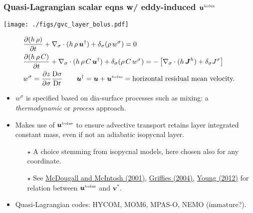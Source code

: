 \documentclass[10pt]{beamer}
\begin{document}
\begin{frame}
  \frametitle{Quasi-Lagrangian scalar eqns w/ eddy-induced ${\bm u}^{\mbox{\tiny bolus}}$}

\begin{center}
\vspace{-.3cm}
{\texttt{[image: ./figs/gvc\_layer\_bolus.pdf]}}
\end{center}
\vspace{-.5cm}

\begin{align}
  &\frac{\partial (h \, \rho)}{\partial  t} + \nabla_{\sigma} \cdot (h \, \rho \, {\bm u}^{\dagger} ) 
 + \delta_{\sigma} (\rho \, w^{\sigma} ) 
 = 0 
 \\
  &\frac{\partial (h \, \rho \, C)}{\partial  t} + \nabla_{\sigma} \cdot (h \, \rho \, C \, {\bm u}^{\dagger} ) 
 + \delta_{\sigma} (\rho \, C \, w^{\sigma} ) 
 =
 -\left[  \nabla_{\sigma} \cdot ( h \, {\bm J}^{h}) +  \delta_{\sigma} J^{\sigma} \right] 
 \\
  &w^{\sigma} =  \frac{\partial z}{\partial \sigma}  \frac{ \mathrm{D} \sigma}{\mathrm{D}t} 
 \qquad {\bm u}^{\dagger}  = {\bm u} + {\bm u}^{\mbox{\tiny bolus}}  = \mbox{horizontal residual mean velocity.}
\label{eq:gvc-mass-tracer-equation}
\end{align}


\vspace{-.2cm} 
\begin{exampleblock}{}
\begin{itemize}

\item $w^{\sigma}$ is specified based on dia-surface processes such as
  mixing: a {\it thermodynamic} or {\it process} approach.

\item Makes use of ${\bm u}^{\mbox{\tiny bolus}}$ to ensure advective
  transport retains layer integrated constant mass, even if not an
  adiabatic isopycnal layer.
 \begin{itemize}
 \item[$\star$] \scriptsize A choice stemming from isopycnal models,
   here chosen also for any coordinate.
 \item[$\star$] See
   \href{https://doi.org/10.1175/1520-0485(2001)031<1222:TTRMVP>2.0.CO;2}{McDougall
     and McIntosh (2001)},
   \href{https://press.princeton.edu/titles/7797.html}{Griffies
     (2004),}
   \href{https://journals.ametsoc.org/doi/full/10.1175/JPO-D-11-0102.1}{Young
     (2012)} for relation between ${\bm u}^{\mbox{\tiny bolus}}$ and
   ${\bm v}^{*}$.
\end{itemize}

\item Quasi-Lagrangian codes: HYCOM, MOM6, MPAS-O, NEMO (immature?).


\end{itemize}
\end{exampleblock}{}

\end{frame}
\end{document}
